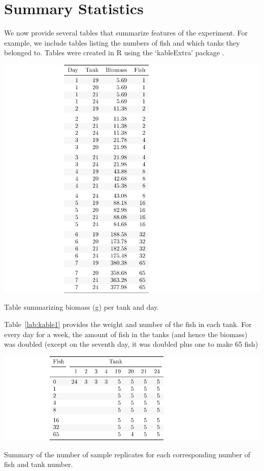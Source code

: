 \section{Summary Statistics}

We now provide several tables that summarize features of the experiment. For example, we include tables listing the numbers of fish and which tanks they belonged to. Tables were created in R using the `kableExtra' package \citep{kable}.

\begin{table}[H]
\includegraphics{Chapter3Images/kable1test.pdf}
\caption{Table summarizing biomass (g) per tank and day.}
\label{lab:kable1}
\end{table}

Table~\ref{lab:kable1} provides the weight and number of the fish in each tank. For every day for a week, the amount of fish in the tanks (and hence the biomass) was doubled (except on the seventh day, it was doubled plus one to make 65 fish)


\begin{table}[H]
\includegraphics{Chapter3Images/kable2fixed2.pdf}
\caption{ Summary of the number of sample replicates for each corresponding number of fish and tank number.
}
\label{lab:kabel2}
\end{table}

